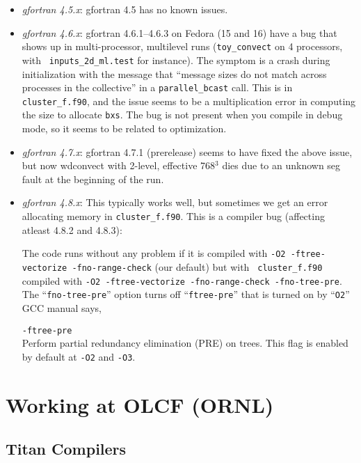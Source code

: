 \begin{itemize}
\item {\em gfortran 4.5.x}: gfortran 4.5 has no known issues.

\item {\em gfortran 4.6.x}: gfortran 4.6.1--4.6.3 on Fedora 
(15 and 16) have a bug that shows up in multi-processor, multilevel
runs ({\tt toy\_convect} on 4 processors, with {\tt
inputs\_2d\_ml.test} for instance).  The symptom is a crash during
initialization with the message that ``message sizes do not match
across processes in the collective'' in a {\tt parallel\_bcast} call.
This is in {\tt cluster\_f.f90}, and the issue seems to be a
multiplication error in computing the size to allocate {\tt bxs}.  The
bug is not present when you compile in debug mode, so it seems to be
related to optimization.

\item {\em gfortran 4.7.x}: gfortran 4.7.1 (prerelease) seems to have 
fixed the above issue, but now wdconvect with 2-level, effective
768$^3$ dies due to an unknown seg fault at the beginning of the run.

\item {\em gfortran 4.8.x}: This typically works well, but sometimes we get
an error allocating memory in {\tt cluster\_f.f90}.  This
is a compiler bug (affecting atleast 4.8.2 and 4.8.3):

The code runs without any problem if it is compiled with {\tt -O2
-ftree-vectorize -fno-range-check} (our default) but with {\tt
cluster\_f.f90} compiled with {\tt -O2 -ftree-vectorize
-fno-range-check -fno-tree-pre}.  The ``{\tt fno-tree-pre}'' option
turns off ``{\tt ftree-pre}'' that is turned on by ``{\tt O2}'' \\
 
GCC manual says,

{\tt -ftree-pre} \\
Perform partial redundancy elimination (PRE) on trees. This flag is enabled by default at {\tt -O2} and {\tt -O3}.



\end{itemize}




\section{Working at OLCF (ORNL)}

\subsection{Titan Compilers}

